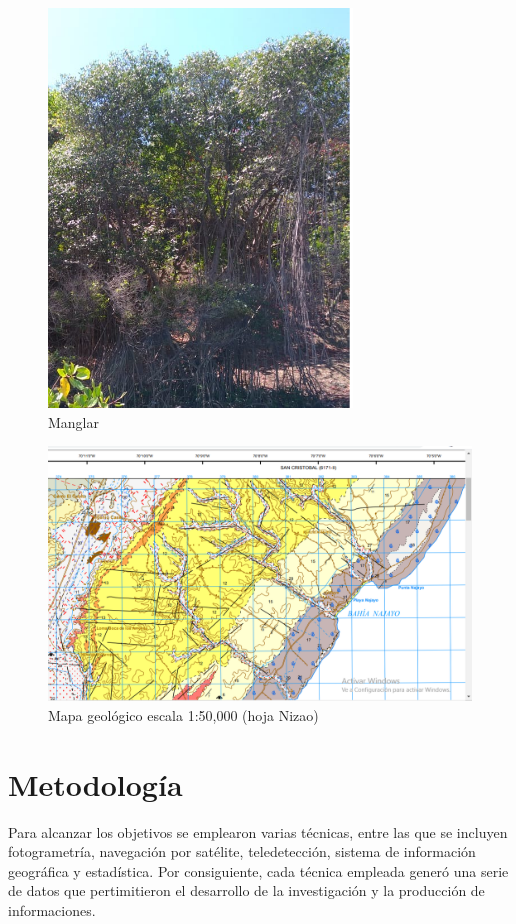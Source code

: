 \documentclass[11pt,]{article}
\begin{document}
\begin{figure}
\centering
\includegraphics[height=4.16667in]{mangle_rojo.png}
\caption{Manglar\label{manglerojo}}
\end{figure}

\begin{figure}
\centering
\includegraphics{mapa_bahia_najayo.png}
\caption{Mapa geológico escala 1:50,000 (hoja Nizao)\label{mapageo50k}}
\end{figure}

\section{Metodología}\label{metodologuxeda}

Para alcanzar los objetivos se emplearon varias técnicas, entre las que
se incluyen fotogrametría, navegación por satélite, teledetección,
sistema de información geográfica y estadística. Por consiguiente, cada
técnica empleada generó una serie de datos que pertimitieron el
desarrollo de la investigación y la producción de informaciones.
\end{document}
